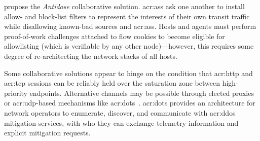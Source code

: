 \Textcite{DBLP:journals/tnsm/SimpsonSMJPH18} propose the \emph{Antidose} collaborative solution.
\glspl{acr:as} ask one another to install allow- and block-list filters to represent the interests of their own transit traffic while disallowing known-bad sources and \glspl{acr:as}.
Hosts and agents must perform proof-of-work challenges attached to flow cookies to become eligible for allowlisting (which is verifiable by any other node)---however, this requires some degree of re-architecting the network stacks of all hosts.

Some collaborative solutions appear to hinge on the condition that \gls{acr:http} and \gls{acr:tcp} sessions can be reliably held over the saturation zone between high-priority endpoints.
Alternative channels may be possible through elected proxies or \gls{acr:udp}-based mechanisms like \gls{acr:dots}~\parencite{ietf-dots-use-cases-17}.
\gls{acr:dots} provides an architecture for network operators to enumerate, discover, and communicate with \gls{acr:ddos} mitigation services, with who they can exchange telemetry information and explicit mitigation requests.
